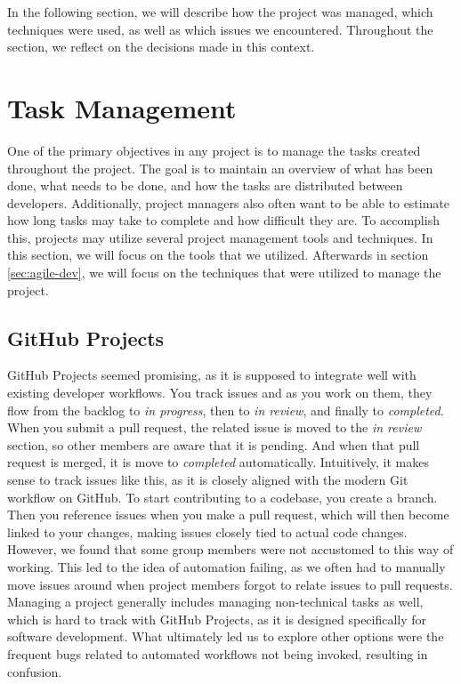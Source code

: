 In the following section, we will describe how the project was managed, which techniques were used, as well as which issues we encountered.
Throughout the section, we reflect on the decisions made in this context.

\section{Task Management}
One of the primary objectives in any project is to manage the tasks created throughout the project. The goal is to maintain an overview of what has been done, what needs to be done, and how the tasks are distributed between developers. Additionally, project managers also often want to be able to estimate how long tasks may take to complete and how difficult they are. To accomplish this, projects may utilize several project management tools and techniques. In this section, we will focus on the tools that we utilized. Afterwards in section \ref{sec:agile-dev}, we will focus on the techniques that were utilized to manage the project.

\subsection{GitHub Projects}
GitHub Projects seemed promising, as it is supposed to integrate well with existing developer workflows. You track issues and as you work on them, they flow from the backlog to \textit{in progress}, then to \textit{in review}, and finally to \textit{completed}. When you submit a pull request, the related issue is moved to the \textit{in review} section, so other members are aware that it is pending. And when that pull request is merged, it is move to \textit{completed} automatically.
Intuitively, it makes sense to track issues like this, as it is closely aligned with the modern Git workflow on GitHub. To start contributing to a codebase, you create a branch. Then you reference issues when you make a pull request, which will then become linked to your changes, making issues closely tied to actual code changes.
However, we found that some group members were not accustomed to this way of working.
This led to the idea of automation failing, as we often had to manually move issues around when project members forgot to relate issues to pull requests.
Managing a project generally includes managing non-technical tasks as well, which is hard to track with GitHub Projects, as it is designed specifically for software development.
What ultimately led us to explore other options were the frequent bugs related to automated workflows not being invoked, resulting in confusion.

